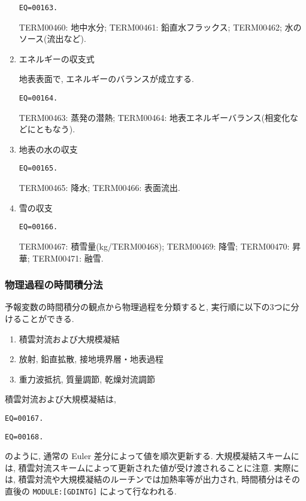 \begin{enumerate}
\begin{verbatim}
EQ=00163.
\end{verbatim}

TERM00460: 地中水分; 
TERM00461: 鉛直水フラックス;
TERM00462; 水のソース(流出など).

\item エネルギーの収支式

地表表面で, エネルギーのバランスが成立する.

\begin{verbatim}
EQ=00164.
\end{verbatim}

TERM00463: 蒸発の潜熱;
TERM00464: 地表エネルギーバランス(相変化などにともなう).

\item 地表の水の収支

\begin{verbatim}
EQ=00165.
\end{verbatim}

TERM00465: 降水;
TERM00466: 表面流出.

\item 雪の収支

\begin{verbatim}
EQ=00166.
\end{verbatim}

TERM00467: 積雪量(kg/TERM00468);
TERM00469: 降雪;
TERM00470: 昇華;
TERM00471: 融雪.

\end{enumerate}

\subsubsection{物理過程の時間積分法}

予報変数の時間積分の観点から物理過程を分類すると,
実行順に以下の3つに分けることができる.
\begin{enumerate}
\item 積雲対流および大規模凝結
\item 放射, 鉛直拡散, 接地境界層・地表過程       
\item 重力波抵抗, 質量調節, 乾燥対流調節
\end{enumerate}

積雲対流および大規模凝結は,
\begin{verbatim}
EQ=00167.
\end{verbatim}
\begin{verbatim}
EQ=00168.
\end{verbatim}
のように, 通常の Euler 差分によって値を順次更新する.
大規模凝結スキームには, 
積雲対流スキームによって更新された値が受け渡されることに注意.
実際には, 積雲対流や大規模凝結のルーチンでは加熱率等が出力され,
時間積分はその直後の \texttt{MODULE:[GDINTG]} によって行なわれる.


